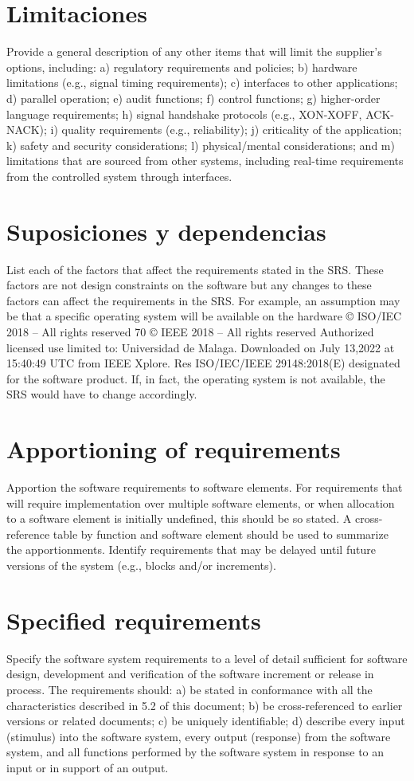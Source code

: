 \documentclass[12pt, a4paper, twoside]{article}
\begin{document}
 \section{Limitaciones}
 Provide a general description of any other items that will limit the supplier's options, including:
 a) regulatory requirements and policies;
 b) hardware limitations (e.g., signal timing requirements);
 c) interfaces to other applications;
 d) parallel operation;
 e) audit functions;
 f) control functions;
 g) higher-order language requirements;
 h) signal handshake protocols (e.g., XON-XOFF, ACK-NACK);
 i) quality requirements (e.g., reliability);
 j) criticality of the application;
 k) safety and security considerations;
 l) physical/mental considerations; and
 m) limitations that are sourced from other systems, including real-time requirements from the
 controlled system through interfaces.

 \section{Suposiciones y dependencias}
 List each of the factors that affect the requirements stated in the SRS. These factors are not design
 constraints on the software but any changes to these factors can affect the requirements in the SRS.
 For example, an assumption may be that a specific operating system will be available on the hardware
 © ISO/IEC 2018 – All rights reserved
 70 © IEEE 2018 – All rights reserved
 Authorized licensed use limited to: Universidad de Malaga. Downloaded on July 13,2022 at 15:40:49 UTC from IEEE Xplore. Res
 ISO/IEC/IEEE 29148:2018(E)
 designated for the software product. If, in fact, the operating system is not available, the SRS would
 have to change accordingly.

 \section{Apportioning of requirements}
 Apportion the software requirements to software elements. For requirements that will require
 implementation over multiple software elements, or when allocation to a software element is initially
 undefined, this should be so stated. A cross-reference table by function and software element should be
 used to summarize the apportionments.
 Identify requirements that may be delayed until future versions of the system (e.g., blocks and/or
 increments).

 \section{Specified requirements}
 Specify the software system requirements to a level of detail sufficient for software design, development
 and verification of the software increment or release in process.
 The requirements should:
 a) be stated in conformance with all the characteristics described in 5.2 of this document;
 b) be cross-referenced to earlier versions or related documents;
 c) be uniquely identifiable;
 d) describe every input (stimulus) into the software system, every output (response) from the
 software system, and all functions performed by the software system in response to an input or in
 support of an output.
\end{document}
